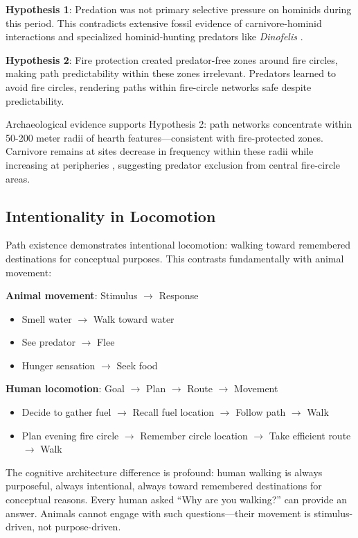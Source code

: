 \documentclass[12pt,a4paper]{article}
\begin{document}
\textbf{Hypothesis 1}: Predation was not primary selective pressure on hominids during this period. This contradicts extensive fossil evidence of carnivore-hominid interactions and specialized hominid-hunting predators like \textit{Dinofelis} \citep{lewis2006carnivore}.

\textbf{Hypothesis 2}: Fire protection created predator-free zones around fire circles, making path predictability within these zones irrelevant. Predators learned to avoid fire circles, rendering paths within fire-circle networks safe despite predictability.

Archaeological evidence supports Hypothesis 2: path networks concentrate within 50-200 meter radii of hearth features—consistent with fire-protected zones. Carnivore remains at sites decrease in frequency within these radii while increasing at peripheries \citep{brain1981hunters}, suggesting predator exclusion from central fire-circle areas.

\subsection{Intentionality in Locomotion}

Path existence demonstrates intentional locomotion: walking toward remembered destinations for conceptual purposes. This contrasts fundamentally with animal movement:

\textbf{Animal movement}: Stimulus $\rightarrow$ Response
\begin{itemize}
\item Smell water $\rightarrow$ Walk toward water
\item See predator $\rightarrow$ Flee
\item Hunger sensation $\rightarrow$ Seek food
\end{itemize}

\textbf{Human locomotion}: Goal $\rightarrow$ Plan $\rightarrow$ Route $\rightarrow$ Movement
\begin{itemize}
\item Decide to gather fuel $\rightarrow$ Recall fuel location $\rightarrow$ Follow path $\rightarrow$ Walk
\item Plan evening fire circle $\rightarrow$ Remember circle location $\rightarrow$ Take efficient route $\rightarrow$ Walk
\end{itemize}

The cognitive architecture difference is profound: human walking is always purposeful, always intentional, always toward remembered destinations for conceptual reasons. Every human asked ``Why are you walking?'' can provide an answer. Animals cannot engage with such questions—their movement is stimulus-driven, not purpose-driven.
\end{document}
